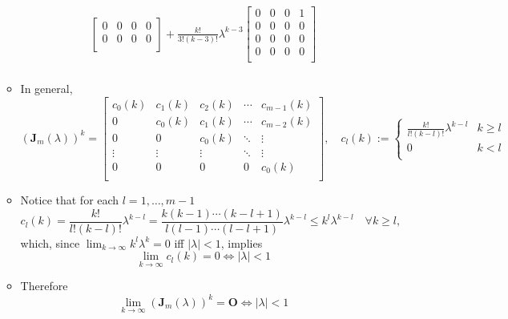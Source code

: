 \documentclass[12pt,a4paper]{article}
\begin{document}
\begin{itemize}
\begin{itemize}
\begin{align}
\begin{bmatrix}
            0 & 0 & 0 & 0 \\
            0 & 0 & 0 & 0 \\
          \end{bmatrix}
        + \frac{k!}{3!(k-3)!}\lambda^{k-3}
          \begin{bmatrix}
            0 & 0 & 0 & 1 \\
            0 & 0 & 0 & 0 \\
            0 & 0 & 0 & 0 \\
            0 & 0 & 0 & 0 \\
          \end{bmatrix}
          \nonumber \\
    \nonumber%
    \end{align}
  \item In general,
    \begin{equation}\nonumber%
      (\bm{J}_{m}(\lambda))^{k}
      =
      \begin{bmatrix}
        c_{0}(k) & c_{1}(k) & c_{2}(k) & \cdots & c_{m-1}(k) \\
        0 & c_{0}(k) & c_{1}(k) & \cdots & c_{m-2}(k) \\
        0 & 0 & c_{0}(k) & \ddots & \vdots \\
        \vdots & \vdots & \vdots & \ddots & \vdots \\
        0 & 0 & 0  & 0 & c_{0}(k) \\
      \end{bmatrix},
      \quad
      c_{l}(k) :=
      \begin{cases}
        \frac{k!}{l!(k-l)!}\lambda^{k-l} & k\geq l \\
        0 & k < l \\
      \end{cases}
    \end{equation}
  \item Notice that for each $l=1,\ldots, m-1$
    \begin{equation}\nonumber%
      c_{l}(k)
      = \frac{k!}{l!(k-l)!}\lambda^{k-l}
      = \frac{k(k-1)\cdots (k-l+1)}{l(l-1)\cdots (l-l+1)}\lambda^{k-l}
      \leq k^{l}\lambda^{k-l}
      \quad \forall k \geq l,
    \end{equation}
    which, since $\lim_{k\to\infty} k^{l}\lambda^{k}=0$ iff $|\lambda|<1$, implies
    \begin{equation}\nonumber%
      \lim_{k\to\infty}c_{l}(k) = 0
      \iff
      |\lambda| < 1
    \end{equation}
  \item Therefore
    \begin{equation}\nonumber%
      \lim_{k\to\infty}(\bm{J}_{m}(\lambda))^{k} = \bm{O}
      \iff
      |\lambda| < 1
    \end{equation}
  \end{itemize}


\end{itemize}
\end{document}
